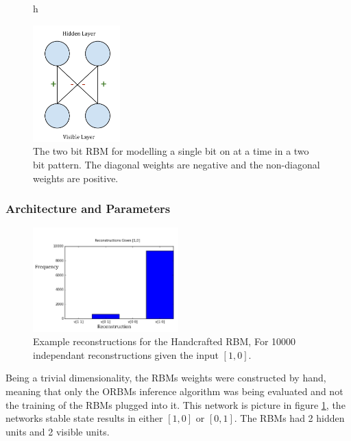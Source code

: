 \begin{figure}{h}
  \begin{center}
    \includegraphics[width=0.3\textwidth]{Assets/Two-Bit-RBM.png}
  \end{center}
  \caption{The two bit RBM for modelling a single bit on at a time in a two bit pattern. The diagonal weights are negative and the non-diagonal weights are positive.}
  \label{F:Two-Bit-RBM}
\end{figure}

\subsubsection{Architecture and Parameters}

\begin{figure}
  \begin{center}
    \includegraphics[width=0.5\textwidth]{Assets/Two-Bit-RBM-Recon.png}
  \end{center}
  \caption{Example reconstructions for the Handcrafted RBM, For 10000 independant reconstructions given the input $[1,0]$.}
  \label{F:Two-Bit-RBM-Recons}
\end{figure}

Being a trivial dimensionality, the RBMs weights were constructed by hand, meaning that only the ORBMs inference algorithm was being evaluated and not the training of the RBMs plugged into it. This network is picture in figure \ref{F:Two-Bit-RBM},  the networks stable state results in either $[1 , 0]$ or $[0 , 1]$. The RBMs had 2 hidden units and 2 visible units.

